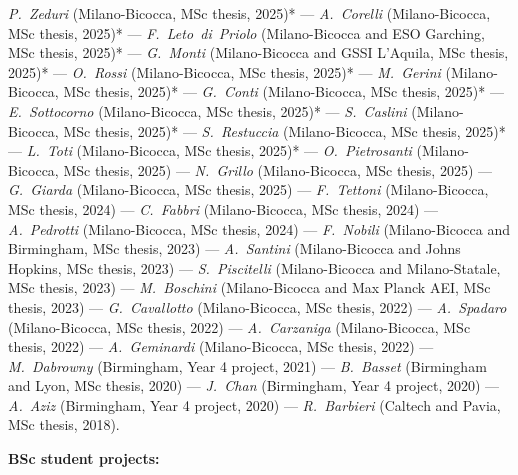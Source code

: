 \textit{\textit{P.~Zeduri}} (Milano-Bicocca, MSc thesis, 2025)* --- 
\textit{\textit{A.~Corelli}} (Milano-Bicocca, MSc thesis, 2025)* --- 
\textit{\textit{F.~Leto~di~Priolo}} (Milano-Bicocca and ESO Garching, MSc thesis, 2025)* --- 
\textit{\textit{G.~Monti}} (Milano-Bicocca and GSSI L'Aquila, MSc thesis, 2025)* --- 
\textit{\textit{O.~Rossi}} (Milano-Bicocca, MSc thesis, 2025)* --- 
\textit{\textit{M.~Gerini}} (Milano-Bicocca, MSc thesis, 2025)* --- 
\textit{\textit{G.~Conti}} (Milano-Bicocca, MSc thesis, 2025)* --- 
\textit{\textit{E.~Sottocorno}} (Milano-Bicocca, MSc thesis, 2025)* --- 
\textit{\textit{S.~Caslini}} (Milano-Bicocca, MSc thesis, 2025)* --- 
\textit{\textit{S.~Restuccia}} (Milano-Bicocca, MSc thesis, 2025)* --- 
\textit{\textit{L.~Toti}} (Milano-Bicocca, MSc thesis, 2025)* --- 
\textit{\textit{O.~Pietrosanti}} (Milano-Bicocca, MSc thesis, 2025) --- 
\textit{\textit{N.~Grillo}} (Milano-Bicocca, MSc thesis, 2025) --- 
\textit{\textit{G.~Giarda}} (Milano-Bicocca, MSc thesis, 2025) --- 
\textit{\textit{F.~Tettoni}} (Milano-Bicocca, MSc thesis, 2024) --- 
\textit{\textit{C.~Fabbri}} (Milano-Bicocca, MSc thesis, 2024) --- 
\textit{\textit{A.~Pedrotti}} (Milano-Bicocca, MSc thesis, 2024) --- 
\textit{\textit{F.~Nobili}} (Milano-Bicocca and Birmingham, MSc thesis, 2023) --- 
\textit{\textit{A.~Santini}} (Milano-Bicocca and Johns Hopkins, MSc thesis, 2023) --- 
\textit{\textit{S.~Piscitelli}} (Milano-Bicocca and Milano-Statale, MSc thesis, 2023) --- 
\textit{\textit{M.~Boschini}} (Milano-Bicocca and Max Planck AEI, MSc thesis, 2023) --- 
\textit{\textit{G.~Cavallotto}} (Milano-Bicocca, MSc thesis, 2022) --- 
\textit{\textit{A.~Spadaro}} (Milano-Bicocca, MSc thesis, 2022) --- 
\textit{\textit{A.~Carzaniga}} (Milano-Bicocca, MSc thesis, 2022) --- 
\textit{\textit{A.~Geminardi}} (Milano-Bicocca, MSc thesis, 2022) --- 
\textit{\textit{M.~Dabrowny}} (Birmingham, Year 4 project, 2021) --- 
\textit{\textit{B.~Basset}} (Birmingham and Lyon, MSc thesis, 2020) --- 
\textit{\textit{J.~Chan}} (Birmingham, Year 4 project, 2020) --- 
\textit{\textit{A.~Aziz}} (Birmingham, Year 4 project, 2020) --- 
\textit{\textit{R.~Barbieri}} (Caltech and Pavia, MSc thesis, 2018).

\vspace{0.2cm}
\textbf{BSc student projects:}

